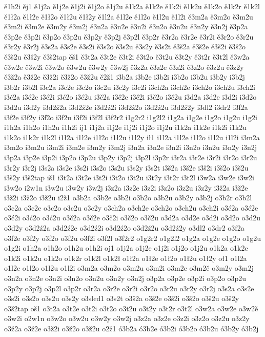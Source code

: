 {ě1h2i
ěj1
ě1j2a
ě1j2e
ě1j2i
ě1j2o
ě1j2u
ě1k2a
ě1k2e
ě1k2i
ě1k2u
ě1k2o
ě1k2r
ě1k2l
ě1ł2a
ě1ł2e
ě1ł2o
ě1ł2u
ě1ł2y
ě1l2a
ě1l2e
ě1l2o
ě1l2u
ě1l2i
ě3m2a
ě3m2o
ě3m2u
ě3m2i
ě3m2e
ě3m2y
ě3m2j
ě3n2a
ě3n2e
ě3n2i
ě3n2o
ě3n2u
ě3n2y
ě3n2j
ě3p2a
ě3p2e
ě3p2i
ě3p2o
ě3p2u
ě3p2y
ě3p2j
ě3p2l
ě3p2r
ě3r2a
ě3r2e
ě3r2i
ě3r2o
ě3r2u
ě3r2y
ě3r2j
ě3s2a
ě3s2e
ě3s2i
ě3s2o
ě3s2u
ě3s2y
ě3s2t
ě3š2a
ě3š2e
ě3š2i
ě3š2o
ě3š2u
ě3š2y
ě3š2tap
ěš1
ě3t2a
ě3t2e
ě3t2i
ě3t2o
ě3t2u
ě3t2y
ě3t2r
ě3t2l
ě3w2a
ě3w2e
ě3w2i
ě3w2o
ě3w2u
ě3w2y
ě3w2j
ě3z2a
ě3z2e
ě3z2i
ě3z2o
ě3z2u
ě3z2y
ě3ž2a
ě3ž2e
ě3ž2i
ě3ž2o
ě3ž2u
ě2ž1
i3b2a
i3b2e
i3b2i
i3b2o
i3b2u
i3b2y
i3b2j
i3b2r
i3b2l
i3c2a
i3c2e
i3c2o
i3c2u
i3c2y
i3c2i
i3ch2a
i3ch2e
i3ch2o
i3ch2u
i3ch2i
i3ć2a
i3ć2e
i3ć2i
i3ć2o
i3ć2u
i3č2a
i3č2e
i3č2i
i3č2o
i3č2u
i3d2a
i3d2e
i3d2i
i3d2o
i3d2u
i3d2y
i3d2ź2a
i3d2ź2e
i3d2ź2i
i3d2ź2o
i3d2ź2u
i3d2ź2y
i3dl2
i3dr2
i3f2a
i3f2e
i3f2y
i3f2o
i3f2u
i3f2i
i3f2l
i3f2r2
i1g2r2
i1g2l2
i1g2a
i1g2e
i1g2o
i1g2u
i1g2i
i1h2a
i1h2o
i1h2u
i1h2i
ij1
i1j2a
i1j2e
i1j2i
i1j2o
i1j2u
i1k2a
i1k2e
i1k2i
i1k2u
i1k2o
i1k2r
i1k2l
i1ł2a
i1ł2e
i1ł2o
i1ł2u
i1ł2y
ił1
i1l2a
i1l2e
i1l2o
i1l2u
i1l2i
i3m2a
i3m2o
i3m2u
i3m2i
i3m2e
i3m2y
i3m2j
i3n2a
i3n2e
i3n2i
i3n2o
i3n2u
i3n2y
i3n2j
i3p2a
i3p2e
i3p2i
i3p2o
i3p2u
i3p2y
i3p2j
i3p2l
i3p2r
i3r2a
i3r2e
i3r2i
i3r2o
i3r2u
i3r2y
i3r2j
i3s2a
i3s2e
i3s2i
i3s2o
i3s2u
i3s2y
i3s2t
i3š2a
i3š2e
i3š2i
i3š2o
i3š2u
i3š2y
i3š2tap
iš1
i3t2a
i3t2e
i3t2i
i3t2o
i3t2u
i3t2y
i3t2r
i3t2l
i3w2a
i3w2e
i3w2i
i3w2o
i2w1n
i3w2u
i3w2y
i3w2j
i3z2a
i3z2e
i3z2i
i3z2o
i3z2u
i3z2y
i3ž2a
i3ž2e
i3ž2i
i3ž2o
i3ž2u
i2ž1
o3b2a
o3b2e
o3b2i
o3b2o
o3b2u
o3b2y
o3b2j
o3b2r
o3b2l
o3c2a
o3c2e
o3c2o
o3c2u
o3c2y
o3ch2a
o3ch2e
o3ch2o
o3ch2u
o3ch2i
o3ć2a
o3ć2e
o3ć2i
o3ć2o
o3ć2u
o3č2a
o3č2e
o3č2i
o3č2o
o3č2u
o3d2a
o3d2e
o3d2i
o3d2o
o3d2u
o3d2y
o3d2ź2a
o3d2ź2e
o3d2ź2i
o3d2ź2o
o3d2ź2u
o3d2ź2y
o3dl2
o3dr2
o3f2a
o3f2e
o3f2y
o3f2o
o3f2u
o3f2i
o3f2l
o3f2r2
o1g2r2
o1g2l2
o1g2a
o1g2e
o1g2o
o1g2u
o1g2i
o1h2a
o1h2o
o1h2u
o1h2i
oj1
o1j2a
o1j2e
o1j2i
o1j2o
o1j2u
o1k2a
o1k2e
o1k2i
o1k2u
o1k2o
o1k2r
o1k2l
o1k2ł
o1ł2a
o1ł2e
o1ł2o
o1ł2u
o1ł2y
oł1
o1l2a
o1l2e
o1l2o
o1l2u
o1l2i
o3m2a
o3m2o
o3m2u
o3m2i
o3m2e
o3m2ě
o3m2y
o3m2j
o3n2a
o3n2e
o3n2i
o3n2o
o3n2u
o3n2y
o3n2j
o3p2a
o3p2e
o3p2i
o3p2o
o3p2u
o3p2y
o3p2j
o3p2l
o3p2r
o3r2a
o3r2e
o3r2i
o3r2o
o3r2u
o3r2y
o3r2j
o3s2a
o3s2e
o3s2i
o3s2o
o3s2u
o3s2y
o3sled1
o3s2t
o3š2a
o3š2e
o3š2i
o3š2o
o3š2u
o3š2y
o3š2tap
oš1
o3t2a
o3t2e
o3t2i
o3t2o
o3t2u
o3t2y
o3t2r
o3t2l
o3w2a
o3w2e
o3w2ě
o3w2i
o2w1n
o3w2o
o3w2u
o3w2y
o3w2j
o3z2a
o3z2e
o3z2i
o3z2o
o3z2u
o3z2y
o3ž2a
o3ž2e
o3ž2i
o3ž2o
o3ž2u
o2ž1
ó3b2a
ó3b2e
ó3b2i
ó3b2o
ó3b2u
ó3b2y
ó3b2j
}
